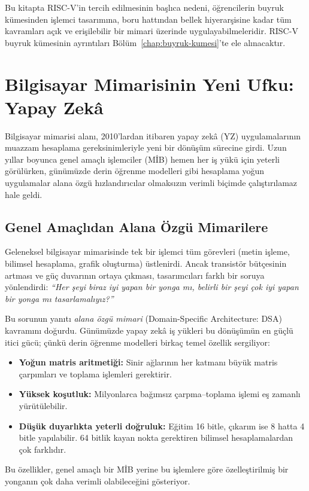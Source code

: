 Bu kitapta RISC-V'in tercih edilmesinin başlıca nedeni, öğrencilerin buyruk kümesinden işlemci tasarımına, boru hattından bellek hiyerarşisine kadar tüm kavramları açık ve erişilebilir bir mimari üzerinde uygulayabilmeleridir. RISC-V buyruk kümesinin ayrıntıları Bölüm~\ref{chap:buyruk-kumesi}'te ele alınacaktır.


\section{Bilgisayar Mimarisinin Yeni Ufku: Yapay Zekâ}
\label{sec:yapay-zeka-ufku}

Bilgisayar mimarisi alanı, 2010'lardan itibaren yapay zekâ (YZ) uygulamalarının muazzam hesaplama gereksinimleriyle yeni bir dönüşüm sürecine girdi. Uzun yıllar boyunca genel amaçlı işlemciler (MİB) hemen her iş yükü için yeterli görülürken, günümüzde derin öğrenme modelleri gibi hesaplama yoğun uygulamalar alana özgü hızlandırıcılar olmaksızın verimli biçimde çalıştırılamaz hale geldi.


\subsection{Genel Amaçlıdan Alana Özgü Mimarilere}
\label{sec:genel-alana-ozgu}

Geleneksel bilgisayar mimarisinde tek bir işlemci tüm görevleri (metin işleme, bilimsel hesaplama, grafik oluşturma) üstlenirdi. Ancak transistör bütçesinin artması ve güç duvarının ortaya çıkması, tasarımcıları farklı bir soruya yönlendirdi: \emph{``Her şeyi biraz iyi yapan bir yonga mı, belirli bir şeyi çok iyi yapan bir yonga mı tasarlamalıyız?''}

Bu sorunun yanıtı \emph{alana özgü mimari} (Domain-Specific Architecture: DSA) kavramını doğurdu. Günümüzde yapay zekâ iş yükleri bu dönüşümün en güçlü itici gücü; çünkü derin öğrenme modelleri birkaç temel özellik sergiliyor:
\begin{itemize}
    \item \textbf{Yoğun matris aritmetiği:} Sinir ağlarının her katmanı büyük matris çarpımları ve toplama işlemleri gerektirir.
    \item \textbf{Yüksek koşutluk:} Milyonlarca bağımsız çarpma--toplama işlemi eş zamanlı yürütülebilir.
    \item \textbf{Düşük duyarlıkta yeterli doğruluk:} Eğitim 16 bitle, çıkarım ise 8 hatta 4 bitle yapılabilir. 64 bitlik kayan nokta gerektiren bilimsel hesaplamalardan çok farklıdır.
\end{itemize}
Bu özellikler, genel amaçlı bir MİB yerine bu işlemlere göre özelleştirilmiş bir yonganın çok daha verimli olabileceğini gösteriyor.


